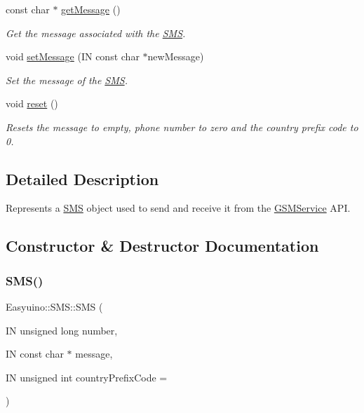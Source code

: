 \begin{DoxyCompactItemize}
const char $\ast$ \hyperlink{class_easyuino_1_1_s_m_s_ac13745969d572629274ae69f3f98ab2e}{get\+Message} ()
\begin{DoxyCompactList}\small\item\em Get the message associated with the \hyperlink{class_easyuino_1_1_s_m_s}{S\+MS}. \end{DoxyCompactList}\item 
void \hyperlink{class_easyuino_1_1_s_m_s_a7c0fdcb9b1a54cf025c6b98618badc21}{set\+Message} (IN const char $\ast$new\+Message)
\begin{DoxyCompactList}\small\item\em Set the message of the \hyperlink{class_easyuino_1_1_s_m_s}{S\+MS}. \end{DoxyCompactList}\item 
\mbox{\label{class_easyuino_1_1_s_m_s_a0f4b83fa7be59e7efa85c4d8e36ec8e3}} 
void \hyperlink{class_easyuino_1_1_s_m_s_a0f4b83fa7be59e7efa85c4d8e36ec8e3}{reset} ()
\begin{DoxyCompactList}\small\item\em Resets the message to empty, phone number to zero and the country prefix code to 0. \end{DoxyCompactList}\end{DoxyCompactItemize}


\subsection{Detailed Description}
Represents a \hyperlink{class_easyuino_1_1_s_m_s}{S\+MS} object used to send and receive it from the \hyperlink{class_easyuino_1_1_g_s_m_service}{G\+S\+M\+Service} A\+PI. 



\subsection{Constructor \& Destructor Documentation}
\mbox{\label{class_easyuino_1_1_s_m_s_a5c56de204df53688169644314e8f0efe}} 
\subsubsection{\texorpdfstring{S\+M\+S()}{SMS()}\hspace{0.1cm}{\footnotesize\ttfamily [1/2]}}
{\footnotesize\ttfamily Easyuino\+::\+S\+M\+S\+::\+S\+MS (\begin{DoxyParamCaption}\item[{IN unsigned long}]{number,  }\item[{IN const char $\ast$}]{message,  }\item[{IN unsigned int}]{country\+Prefix\+Code = {} }\end{DoxyParamCaption})}



